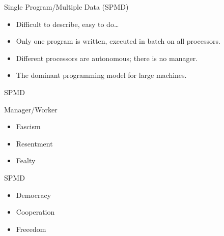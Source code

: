 \begin{frame}
  \begin{block}{Single Program/Multiple Data (SPMD)}\pause
    \begin{itemize}
      \item Difficult to describe, easy to do\dots
      \item Only one program is written, executed in batch on all processors.
      \item Different processors are autonomous; there is no manager.
      \item The dominant programming model for large machines.
    \end{itemize}
  \end{block}
\end{frame}


\begin{frame}[fragile]
  \begin{block}{SPMD}
    \begin{center}
        \begin{minipage}{.47\textwidth}
        \begin{block}{Manager/Worker}
        \begin{itemize}
          \item Fascism
          \item Resentment
          \item Fealty
        \end{itemize}
        \end{block}
        \end{minipage}
        \hspace{.1cm}
        \begin{minipage}{.47\textwidth}
        \begin{block}{SPMD}
        \begin{itemize}
          \item Democracy
          \item Cooperation
          \item Freeedom
        \end{itemize}
        \end{block}
        \end{minipage}
    \end{center}
  \end{block}
\end{frame}


